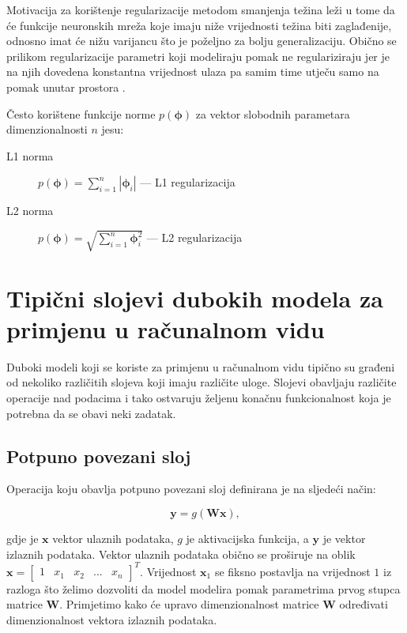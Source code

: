 \documentclass[times, utf8, diplomski, numeric]{fer}
\begin{document}
Motivacija za korištenje regularizacije metodom smanjenja težina leži u tome da će funkcije neuronskih mreža koje imaju niže vrijednosti težina biti zaglađenije, odnosno imat će nižu varijancu što je poželjno za bolju generalizaciju.
Obično se prilikom regularizacije parametri koji modeliraju pomak ne regulariziraju jer je na njih dovedena konstantna vrijednost ulaza pa samim time utječu samo na pomak unutar prostora \citep{seminar:rela}.

Često korištene funkcije norme $p(\boldsymbol{\phi})$ za vektor slobodnih parametara dimenzionalnosti $n$ jesu:
\begin{description}
 \item [L1 norma] $p(\boldsymbol{\phi})=\sum_{i=1}^n \left| \boldsymbol{\phi}_i \right|$ --- L1  regularizacija
 \item [L2 norma] $p(\boldsymbol{\phi})=\sqrt{\sum_{i=1}^n  \boldsymbol{\phi}_i^2 }$ --- L2  regularizacija
 
\end{description}

\section{Tipični slojevi dubokih modela za primjenu u računalnom vidu}
Duboki modeli koji se koriste za primjenu u računalnom vidu tipično su građeni od nekoliko različitih slojeva koji imaju različite uloge.
Slojevi obavljaju različite operacije nad podacima i tako ostvaruju željenu konačnu funkcionalnost koja je potrebna da se obavi neki zadatak.

\subsection{Potpuno povezani sloj}
Operacija koju obavlja potpuno povezani sloj definirana je na sljedeći način:

\begin{equation}
 \mathbf{y}=g(\mathbf{W}\mathbf{x}),
\end{equation}

\noindent gdje je $\mathbf{x}$ vektor ulaznih podataka, $g$ je aktivacijska funkcija, a  $\mathbf{y}$ je vektor izlaznih podataka. 
Vektor ulaznih podataka obično se proširuje na oblik $\mathbf{x} = \begin{bmatrix} 1 & x_1 & x_2 & ... & x_n \end{bmatrix}^T$.
Vrijednost $\mathbf{x}_1$ se fiksno postavlja na vrijednost $1$ iz razloga što želimo dozvoliti da model modelira pomak parametrima prvog stupca matrice $\mathbf{W}$.
Primjetimo kako će upravo dimenzionalnost matrice $\mathbf{W}$ određivati dimenzionalnost vektora izlaznih podataka.
\end{document}
